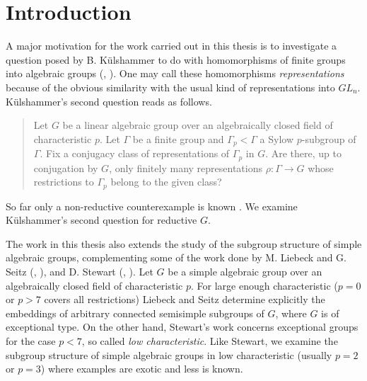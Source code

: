 
\chapter{Introduction}
\label{Chapter1}

A major motivation for the work carried out in this thesis is to investigate a question posed by B. K\"ulshammer to do with homomorphisms of finite groups into algebraic groups (\cite{slodowy1997two}, \cite{kulshammer1995donovan}). One may call these homomorphisms \emph{representations} because of the obvious similarity with the usual kind of representations into $GL_n$. K\"ulshammer's second question reads as follows.
\begin{quote}
  Let $G$ be a linear algebraic group over an algebraically closed field of characteristic $p$. Let $\Gamma$ be a finite group and $\Gamma_p < \Gamma$ a Sylow $p$-subgroup of $\Gamma$. Fix a conjugacy class of representations of $\Gamma_p$ in $G$. Are there, up to conjugation by $G$, only finitely many representations $\rho:\Gamma\rightarrow G$ whose restrictions to $\Gamma_p$ belong to the given class?
\end{quote}

So far only a non-reductive counterexample is known \cite[Appendix]{slodowy1997two}. We examine K\"ulshammer's second question for reductive $G$. 


The work in this thesis also extends the study of the subgroup structure of simple algebraic groups, complementing some of the work done by M. Liebeck and G. Seitz (\cite{liebeck1996reductive}, \cite{liebeck2004maximal}), and D. Stewart (\cite{stewart2010g}, \cite{stewart2010red}).
Let $G$ be a simple algebraic group over an algebraically closed field of characteristic $p$. For large enough characteristic ($p=0$ or $p>7$ covers all restrictions) Liebeck and Seitz determine explicitly the embeddings of arbitrary connected semisimple subgroups of $G$, where $G$ is of exceptional type.
On the other hand, Stewart's work concerns exceptional groups for the case $p<7$, so called \emph{low characteristic}.
Like Stewart, we examine the subgroup structure of simple algebraic groups in low characteristic (usually $p=2$ or $p=3$) where examples are exotic and less is known. 


